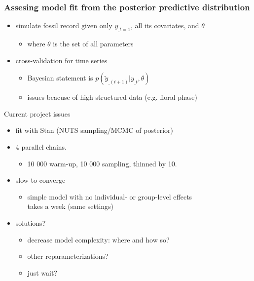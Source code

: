\documentclass{beamer}
\begin{document}
\begin{frame}
  \frametitle{Assesing model fit from the posterior predictive distribution}
  \begin{itemize}
    \item simulate fossil record given only \(y_{\_t = 1}\), all its covariates, and \(\theta\)
      \begin{itemize}
        \item where \(\theta\) is the set of all parameters
      \end{itemize}
    \item cross-validation for time series
      \begin{itemize}
        \item Bayesian statement is \(p(\tilde{y}_{\_(t + 1)} | y_{\_t}, \theta)\)
        \item issues beacuse of high structured data (e.g. floral phase)
      \end{itemize}
  \end{itemize}
\end{frame}

\begin{frame}
  \begin{alertblock}{Current project issues}
    \begin{itemize}
      \item fit with Stan (NUTS sampling/MCMC of posterior)
      \item 4 parallel chains. 
        \begin{itemize}
          \item 10 000 warm-up, 10 000 sampling, thinned by 10.
        \end{itemize}
      \item slow to converge 
        \begin{itemize}
          \item simple model with no individual- or group-level effects \\takes a week (same settings)
        \end{itemize}
      \item solutions?
        \begin{itemize}
          \item decrease model complexity: where and how so?
          \item other reparameterizations?
          \item just wait?
        \end{itemize}
    \end{itemize}
  \end{alertblock}
\end{frame}
\end{document}
